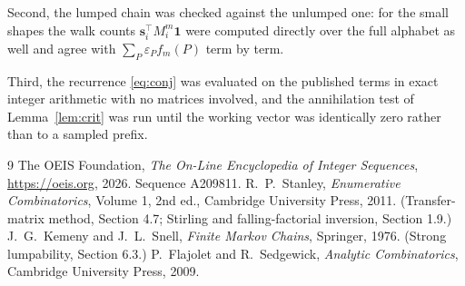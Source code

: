 \documentclass[11pt,a4paper]{article}
\theoremstyle{plain}
\theoremstyle{definition}
\begin{document}
Second, the lumped chain was checked against the unlumped one: for the small shapes the walk
counts $\mathbf{s}_i^{\!\top}M_i^{m}\mathbf{1}$ were computed directly over the full
alphabet as well and agree with $\sum_P\varepsilon_Pf_m(P)$ term by term.

Third, the recurrence \eqref{eq:conj} was evaluated on the published terms in exact integer
arithmetic with no matrices involved, and the annihilation test of Lemma~\ref{lem:crit} was
run until the working vector was identically zero rather than to a sampled prefix.

\begin{thebibliography}{9}
 The OEIS Foundation, \emph{The On-Line Encyclopedia of Integer
Sequences}, \url{https://oeis.org}, 2026. Sequence A209811.
 R.~P.~Stanley, \emph{Enumerative Combinatorics}, Volume 1, 2nd ed.,
Cambridge University Press, 2011. (Transfer-matrix method, Section 4.7; Stirling and
falling-factorial inversion, Section 1.9.)
 J.~G.~Kemeny and J.~L.~Snell, \emph{Finite Markov Chains}, Springer,
1976. (Strong lumpability, Section 6.3.)
 P.~Flajolet and R.~Sedgewick, \emph{Analytic Combinatorics}, Cambridge
University Press, 2009.
\end{thebibliography}
\end{document}
